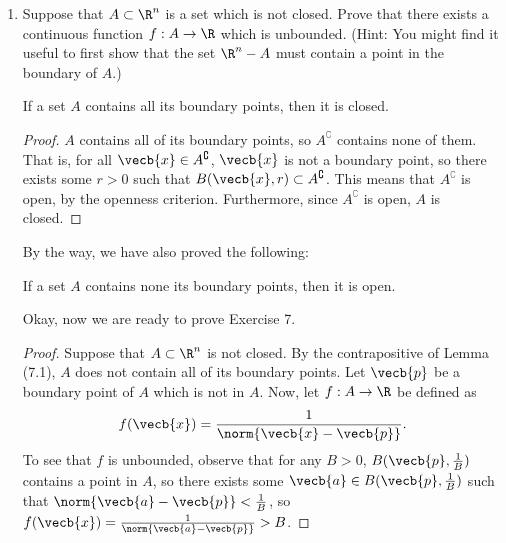 \documentclass[letterpaper]{article}
\begin{document}
\begin{enumerate}
\item Suppose that $A \subset \R^n$ is a set which is not closed. Prove that there exists a continuous function $f:A\to\R$ which is unbounded. (Hint: You might find it useful to first show that the set $\R^n-A$ must contain a point in the boundary of $A$.)
\begin{lemma*}[7.1]
If a set $A$ contains all its boundary points, then it is closed. 
\end{lemma*}
\begin{proof}
$A$ contains all of its boundary points, so $A^\complement$ contains none of them. That is, for all $\vecb{x}\in A^\complement$, $\vecb{x}$ is not a boundary point, so there exists some $r>0$ such that $B(\vecb{x}, r)\subset A^\complement$. This means that $A^\complement$ is open, by the openness criterion. Furthermore, since $A^\complement$ is open, $A$ is closed. 
\end{proof}
By the way, we have also proved the following:
\begin{corollary*}[7.2]
If a set $A$ contains none its boundary points, then it is open.
\end{corollary*}
Okay, now we are ready to prove Exercise 7. 
\begin{proof}
Suppose that $A \subset \R^n$ is not closed. By the contrapositive of Lemma (7.1), $A$ does not contain all of its boundary points. Let $\vecb{p}$ be a boundary point of $A$ which is not in $A$. Now, let $f:A\to\R$ be defined as 
$$f(\vecb{x})=\frac{1}{\norm{\vecb{x}-\vecb{p}}}.$$
To see that $f$ is unbounded, observe that for any $B>0$, $B(\vecb{p},\frac{1}{B})$ contains a point in $A$, so there exists some $\vecb{a}\in B(\vecb{p},\frac{1}{B})$ such that $\norm{\vecb{a}-\vecb{p}}<\frac{1}{B}$, so $f(\vecb{x})=\frac{1}{\norm{\vecb{a}-\vecb{p}}}>B$. 
\end{proof}
\end{enumerate}
\end{document}
